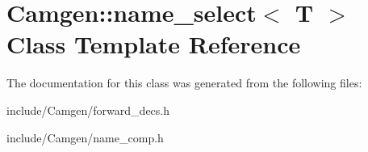 \hypertarget{a00384}{}\section{Camgen\+:\+:name\+\_\+select$<$ T $>$ Class Template Reference}
\label{a00384}


The documentation for this class was generated from the following files\+:\begin{DoxyCompactItemize}
\item 
include/\+Camgen/forward\+\_\+decs.\+h\item 
include/\+Camgen/name\+\_\+comp.\+h\end{DoxyCompactItemize}
